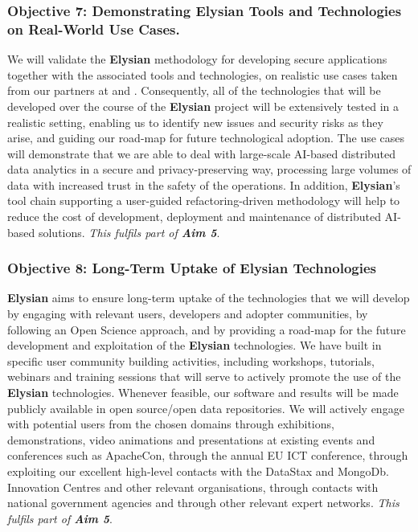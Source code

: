 \documentclass[a4paper,11pt]{article}
\newcommand{\project}[1]{\textbf{#1}\xspace}
\newcommand{\SECURITY}{\project{Elysian}}
\newcommand{\TheProject}{\SECURITY}
\begin{document}
\subsubsection*{Objective 7: Demonstrating \TheProject{} Tools and Technologies on Real-World Use Cases.}
\vspace{-6pt}
We will validate the \TheProject{} methodology for developing secure applications together with the associated tools and technologies, on realistic use cases taken from our partners at \SOPRAshort{} and \FRQshort{}.
Consequently, all of the technologies that will be developed over the course of the \TheProject{} project will be extensively tested in a realistic setting, enabling us to identify new issues and security risks as they arise, and guiding our road-map for future technological adoption. The use cases will demonstrate that we are able to deal with large-scale AI-based distributed data analytics in a secure and privacy-preserving way, processing large volumes of data with increased trust in the safety of the operations. In addition, \TheProject{}'s tool chain supporting
a user-guided refactoring-driven methodology %
will help to reduce the cost of development, deployment and maintenance of distributed AI-based solutions. 
\emph{This fulfils part of \textbf{Aim 5}}.

\subsubsection*{Objective 8: Long-Term Uptake of \TheProject{} Technologies} 
\vspace{-7pt}
\TheProject{} aims to ensure long-term uptake of the technologies that we will develop by engaging with relevant users, developers and adopter communities, by following an Open Science approach, and by providing a road-map for the future development and exploitation of the \TheProject{} technologies. We have built in specific user community building activities, including  workshops, tutorials, webinars and training sessions that will serve to actively promote the use of the \TheProject{} technologies. Whenever feasible, our software and results will be made publicly available in open source/open data repositories. We will actively engage with potential users from the chosen domains through exhibitions, demonstrations, video animations and presentations at existing events and conferences such as ApacheCon, through the annual EU ICT conference, through exploiting our excellent high-level contacts with the DataStax and MongoDb. Innovation Centres and other relevant organisations, through contacts with national government agencies and through other relevant expert networks.
\emph{This fulfils part of \textbf{Aim 5}}.
\end{document}
